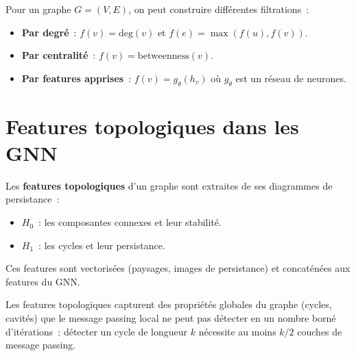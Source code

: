 \begin{remarque}
Pour un graphe $G = (V, E)$, on peut construire diff\'erentes
filtrations~:
\begin{itemize}
  \item \textbf{Par degr\'e}~: $f(v) = \mathrm{deg}(v)$ et
        $f(e) = \max(f(u), f(v))$.
  \item \textbf{Par centralit\'e}~: $f(v) = \mathrm{betweenness}(v)$.
  \item \textbf{Par features apprises}~: $f(v) = g_\theta(h_v)$
        o\`u $g_\theta$ est un r\'eseau de neurones.
\end{itemize}
\end{remarque}

\section{Features topologiques dans les GNN}
\label{sec:features_topo}

\begin{definition}
Les \textbf{features topologiques} d'un graphe sont extraites
de ses diagrammes de persistance~:
\begin{itemize}
  \item $H_0$~: les composantes connexes et leur stabilit\'e.
  \item $H_1$~: les cycles et leur persistance.
\end{itemize}
Ces features sont vectoris\'ees (paysages, images de persistance)
et concat\'en\'ees aux features du GNN.
\end{definition}

\begin{proposition}
Les features topologiques capturent des propri\'et\'es globales
du graphe (cycles, cavit\'es) que le message passing local
ne peut pas d\'etecter en un nombre born\'e d'it\'erations~:
d\'etecter un cycle de longueur $k$ n\'ecessite au moins $k/2$
couches de message passing.
\end{proposition}


